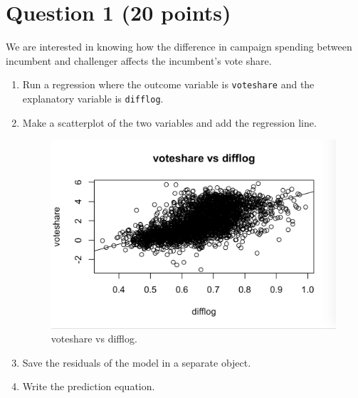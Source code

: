 \documentclass[12pt,letterpaper]{article}
\begin{document}
\section*{Question 1 (20 points)}
\vspace{.25cm}
\noindent We are interested in knowing how the difference in campaign spending between incumbent and challenger affects the incumbent's vote share. 
	\begin{enumerate}
		\item Run a regression where the outcome variable is \texttt{voteshare} and the explanatory variable is \texttt{difflog}.	
			
		  
		
		\item Make a scatterplot of the two variables and add the regression line. 	
		
		  
			\begin{figure}[h!]
			\includegraphics[width=\linewidth]{PS31}
			\caption{voteshare vs difflog.}
			\label{fig:PS31}
			\end{figure}	
		
		\item Save the residuals of the model in a separate object.	
		
		  
		
		\item Write the prediction equation.
		
		  
		
	\end{enumerate}
	
\end{document}
